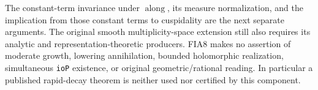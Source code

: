 The constant-term invariance under \(\operatorname{along}\),
its measure normalization, and the implication from those
constant terms to cuspidality are the next separate arguments.
The original smooth multiplicity-space extension still also
requires its analytic and representation-theoretic producers.
FIA8 makes no assertion of moderate growth, lowering
annihilation, bounded holomorphic realization, simultaneous
\texttt{ioP} existence, or original geometric/rational reading.
In particular a published rapid-decay theorem is neither used
nor certified by this component.
